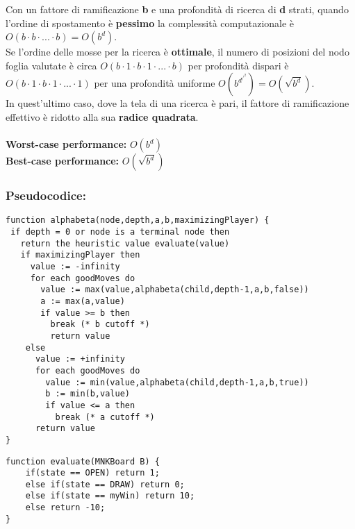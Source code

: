 \documentclass{article}
\begin{document}
    Con un fattore di ramificazione \textbf{b} e una profondità di ricerca di \textbf{d} strati, quando l'ordine di spostamento è \textbf{pessimo} la complessità computazionale  è $O(b\cdot b\cdot ...\cdot b) = O(b^d)$.\\
    Se l'ordine delle mosse per la ricerca è \textbf{ottimale}, il numero di posizioni del nodo foglia valutate è circa $O(b \cdot 1 \cdot b \cdot 1 \cdot ... \cdot b)$ per profondità dispari è $O(b \cdot 1 \cdot b \cdot 1 \cdot ... \cdot 1)$ per una profondità uniforme  $O(b^d^/^2) = O(\sqrt{b^d})$.\\
    In quest'ultimo caso, dove la tela di una ricerca è pari, il fattore di ramificazione effettivo è ridotto alla sua \textbf{radice quadrata}.
 \citep{alpha-beta}
    \\\\
    \textbf{Worst-case performance:} $O(b^d)$
    \\
    \textbf{Best-case performance:} $O(\sqrt{b^d})$

    \subsubsection{Pseudocodice:}
    \lstset{language=java, numbers=left,numbersep=8pt,  }
    \begin{lstlisting}[frame=single]  
function alphabeta(node,depth,a,b,maximizingPlayer) {
 if depth = 0 or node is a terminal node then
   return the heuristic value evaluate(value)
   if maximizingPlayer then
     value := -infinity
     for each goodMoves do
       value := max(value,alphabeta(child,depth-1,a,b,false))
       a := max(a,value)
       if value >= b then
         break (* b cutoff *)
         return value
    else
      value := +infinity
      for each goodMoves do
        value := min(value,alphabeta(child,depth-1,a,b,true))
        b := min(b,value)
        if value <= a then
          break (* a cutoff *)
      return value
}
    \end{lstlisting}
    
        \lstset{language=java}
    \begin{lstlisting}[frame=single]  
function evaluate(MNKBoard B) {
    if(state == OPEN) return 1;
    else if(state == DRAW) return 0;
    else if(state == myWin) return 10;
    else return -10;
}
    \end{lstlisting}
    
\end{document}
